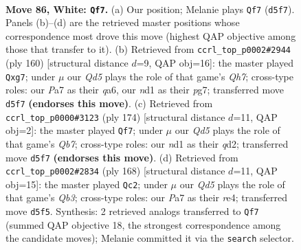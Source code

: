 \documentclass[11pt]{article}
\begin{document}
\clearpage

\begin{figure}[p]\centering
\begin{subfigure}{0.46\textwidth}\centering
\resizebox{\linewidth}{!}{%
\newchessgame
\chessboard[
  setfen={7k/P7/8/3Q2K1/8/8/8/3n4 w - - 3 86},
  showmover=false,
  pgfstyle=straightmove, color=movearrow, markmove={d5-f7}
]}
\caption{}
\end{subfigure}\hfill
\begin{subfigure}{0.46\textwidth}\centering
\resizebox{\linewidth}{!}{%
\newchessgame
\chessboard[
  setfen={4k3/6pQ/q7/8/4K3/1P6/8/8 w - - 14 81},
  showmover=false,
  pgfstyle=straightmove, color=movearrow, markmove={h7-g7}
]}
\caption{}
\end{subfigure}
\\[4pt]
\begin{subfigure}{0.46\textwidth}\centering
\resizebox{\linewidth}{!}{%
\newchessgame
\chessboard[
  setfen={7k/1Q6/8/8/4K1P1/p7/3q4/8 w - - 18 88},
  showmover=false,
  pgfstyle=straightmove, color=movearrow, markmove={b7-f7}
]}
\caption{}
\end{subfigure}\hfill
\begin{subfigure}{0.46\textwidth}\centering
\resizebox{\linewidth}{!}{%
\newchessgame
\chessboard[
  setfen={8/8/6p1/8/4r2k/1Q5n/8/3K4 w - - 17 85},
  showmover=false,
  pgfstyle=straightmove, color=movearrow, markmove={b3-c2}
]}
\caption{}
\end{subfigure}
\caption{\textbf{Move 86, White: \texttt{Qf7}.} (a) Our position; Melanie plays \texttt{Qf7} (\texttt{d5f7}). Panels (b)--(d) are the retrieved master positions whose correspondence most drove this move (highest QAP objective among those that transfer to it). (b) Retrieved from \texttt{ccrl\_top\_p0002\#2944} (ply 160) [structural distance $d$=9, QAP obj=16]: the master played \texttt{Qxg7}; under $\mu$ our \emph{Qd5} plays the role of that game's \emph{Qh7}; cross-type roles: our \emph{P}a7 as their \emph{q}a6, our \emph{n}d1 as their \emph{p}g7; transferred move \texttt{d5f7} \textbf{(endorses this move)}. (c) Retrieved from \texttt{ccrl\_top\_p0000\#3123} (ply 174) [structural distance $d$=11, QAP obj=2]: the master played \texttt{Qf7}; under $\mu$ our \emph{Qd5} plays the role of that game's \emph{Qb7}; cross-type roles: our \emph{n}d1 as their \emph{q}d2; transferred move \texttt{d5f7} \textbf{(endorses this move)}. (d) Retrieved from \texttt{ccrl\_top\_p0002\#2834} (ply 168) [structural distance $d$=11, QAP obj=15]: the master played \texttt{Qc2}; under $\mu$ our \emph{Qd5} plays the role of that game's \emph{Qb3}; cross-type roles: our \emph{P}a7 as their \emph{r}e4; transferred move \texttt{d5f5}. Synthesis: 2 retrieved analogs transferred to \texttt{Qf7} (summed QAP objective 18, the strongest correspondence among the candidate moves); Melanie committed it via the \texttt{search} selector.}
\label{fig:thought-m170}
\end{figure}
\end{document}
